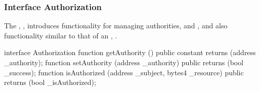 \subsubsection{Interface Authorization}

The , , introduces functionality
for managing authorities,  and , and also functionality similar to that of an ,
.\footnotemark{}


\begin{solidity}
interface Authorization {
  function getAuthority () public constant returns (address _authority);
  function setAuthority (address _authority) public returns (bool _success);
  function isAuthorized (address _subject, bytes4 _resource) public returns (bool _isAuthorized);
}
\end{solidity}

